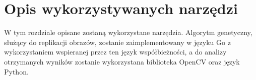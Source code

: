 \chapter{Opis wykorzystywanych narzędzi}
\thispagestyle{chapterBeginStyle}

W tym rozdziale opisane zostaną wykorzystane narzędzia. Algorytm genetyczny, służący do replikacji obrazów, zostanie zaimplementowany w języku Go z wykorzystaniem wspieranej przez ten język współbieżności, a do analizy otrzymanych wyników zostanie wykorzystana biblioteka OpenCV oraz język Python.